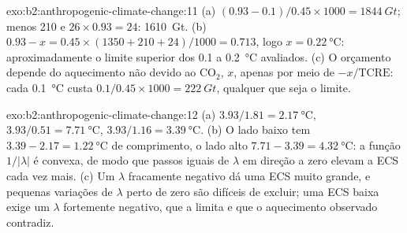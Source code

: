 \begin{solution}{exo:b2:anthropogenic-climate-change:11}
(a) $(0.93 - 0.1)/0.45 \times 1000 = \qty{1844}{Gt}$; menos 210 e $26 \times 0.93 = 24$:
\qty{1610}{Gt}. (b) $0.93 - x = 0.45 \times (1350 + 210 + 24)/1000 = 0.713$, logo $x =
\qty{0.22}{\celsius}$: aproximadamente o limite superior dos 0.1 a \qty{0.2}{\celsius} avaliados. (c) O
orçamento depende do aquecimento não devido ao CO$_2$, $x$, apenas por meio de $-x/\text{TCRE}$: cada
\qty{0.1}{\celsius} custa $0.1/0.45 \times 1000 = \qty{222}{Gt}$, qualquer que seja o limite.
\end{solution}

\begin{solution}{exo:b2:anthropogenic-climate-change:12}
(a) $3.93/1.81 = \qty{2.17}{\celsius}$, $3.93/0.51 = \qty{7.71}{\celsius}$, $3.93/1.16 =
\qty{3.39}{\celsius}$. (b) O lado baixo tem $3.39 - 2.17 = \qty{1.22}{\celsius}$ de comprimento, o lado alto
$7.71 - 3.39 = \qty{4.32}{\celsius}$: a função $1/|\lambda|$ é convexa, de modo que passos iguais de
$\lambda$ em direção a zero elevam a ECS cada vez mais. (c) Um $\lambda$ fracamente negativo dá uma ECS muito
grande, e pequenas variações de $\lambda$ perto de zero são difíceis de excluir; uma ECS baixa exige um $\lambda$
fortemente negativo, que a  limita e que o aquecimento observado contradiz.
\end{solution}

